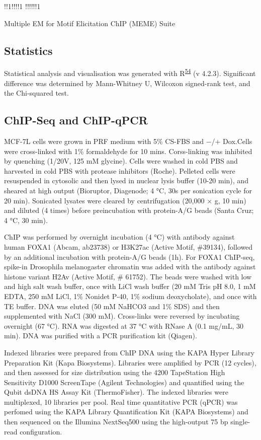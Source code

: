 \documentclass[
  11pt,
]{article}
\begin{document}
!!1!!!!1
!!!!!!1

Multiple EM for Motif Elicitation ChIP (MEME) Suite

\hypertarget{statistics}{%
\subsection{Statistics}\label{statistics}}

Statistical analysis and visualisation was generated with R\textsuperscript{\protect\hyperlink{ref-r}{54}} (v 4.2.3).
Significant difference was determined by Mann-Whitney U, Wilcoxon signed-rank test, and the Chi-squared test.

\hypertarget{chip-seq-and-chip-qpcr}{%
\subsection{ChIP-Seq and ChIP-qPCR}\label{chip-seq-and-chip-qpcr}}

MCF-7L cells were grown in PRF medium with 5\% CS-FBS and −/+ Dox.Cells were cross-linked with 1\% formaldehyde for 10 mins.
Corss-linking was inhibited by quenching (1/20V, 125 mM glycine).
Cells were washed in cold PBS and harvested in cold PBS with protease inhibitors (Roche).
Pelleted cells were resuspended in cytosolic and then lysed in nuclear lysis buffer (10-20 min), and sheared at high output (Bioruptor, Diagenode; 4 °C, 30s per sonication cycle for 20 min).
Sonicated lysates were cleared by centrifugation (20,000 × g, 10 min) and diluted (4 times) before preincubation with protein-A/G beads (Santa Cruz; 4 °C, 30 min).

ChIP was performed by overnight incubation (4 °C) with antibody against human FOXA1 (Abcam, ab23738) or H3K27ac (Active Motif, \#39134), followed by an additional incubation with protein-A/G beads (1h).
For FOXA1 ChIP-seq, spike-in Drosophila melanogaster chromatin was added with the antibody against histone variant H2Av (Active Motif, \# 61752).
The beads were washed with low and high salt wash buffer, once with LiCl wash buffer (20 mM Tris pH 8.0, 1 mM EDTA, 250 mM LiCl, 1\% Nonidet P-40, 1\% sodium deoxycholate), and once with TE buffer.
DNA was eluted (50 mM NaHCO3 and 1\% SDS) and then supplemented with NaCl (300 mM).
Cross-links were reversed by incubating overnight (67 °C).
RNA was digested at 37 °C with RNase A (0.1 mg/mL, 30 min).
DNA was purified with a PCR purification kit (Qiagen).

Indexed libraries were prepared from ChIP DNA using the KAPA Hyper Library Preparation Kit (Kapa Biosystems).
Libraries were amplified by PCR (12 cycles), and then assessed for size distribution using the 4200 TapeStation High Sensitivity D1000 ScreenTape (Agilent Technologies) and quantified using the Qubit dsDNA HS Assay Kit (ThermoFisher).
The indexed libraries were multiplexed, 10 libraries per pool.
Real time quantitative PCR (qPCR) was perfomed using the KAPA Library Quantification Kit (KAPA Biosystems) and then sequenced on the Illumina NextSeq500 using the high-output 75 bp single-read configuration.
\end{document}
